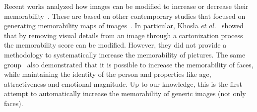 \documentclass{sig-alternate-05-2015}
\begin{document}
Recent works analyzed how images can be modified to increase or decrease their memorability~\cite{khosla2013modifying,khosla2015understanding}. These are based on other contemporary studies that focused on generating memorability maps of images~\cite{khosla2012image,khosla2012memorability,khosla2014what}. In particular, Khosla \textit{et al.}~\cite{khosla2015understanding} showed that by removing visual details from an image through a cartonization process the memorability score can be modified. However, they did not provide a methodology to systematically increase the memorability of pictures. The same group~\cite{khosla2013modifying} also demonstrated that it is possible to increase the memorability of faces, while maintaining the identity of the person and properties like age, attractiveness and emotional magnitude. Up to our knowledge, this is the first attempt to automatically increase the memorability of generic images (not only faces).

\end{document}
